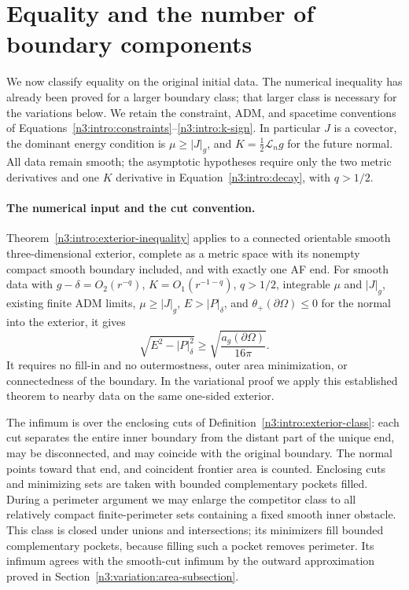 \section{Equality and the number of boundary components}
\label{n3:rigidity:setup}

We now classify equality on the original initial data. The numerical
inequality has already been proved for a larger boundary class; that
larger class is necessary for the variations below. We retain the
constraint, ADM, and spacetime conventions of
Equations~\eqref{n3:intro:constraints}--\eqref{n3:intro:k-sign}.
In particular $J$ is a covector, the dominant energy condition is
$\mu\geq|J|_g$, and $K=\tfrac12\mathcal L_n g$ for the future normal.
All data remain smooth; the asymptotic hypotheses require only the two
metric derivatives and one $K$ derivative in
Equation~\eqref{n3:intro:decay}, with $q>1/2$.

\paragraph{The numerical input and the cut convention.}
Theorem~\ref{n3:intro:exterior-inequality} applies to a connected orientable
smooth three-dimensional exterior, complete as a metric space with its
nonempty compact smooth boundary included, and with exactly one AF end.
For smooth data with $g-\delta=O_2(r^{-q})$,
$K=O_1(r^{-1-q})$, $q>1/2$, integrable $\mu$ and $|J|_g$, existing
finite ADM limits, $\mu\geq|J|_g$, $E>|P|_\delta$, and
$\theta_+(\partial\Omega)\leq0$ for the normal into the exterior, it gives
\[
\sqrt{E^2-|P|_\delta^2}\geq
\sqrt{\frac{a_g(\partial\Omega)}{16\pi}}.
\]
It requires no fill-in and no outermostness, outer area minimization,
or connectedness of the boundary. In the variational proof we apply
this established theorem to nearby data on the same one-sided exterior.

The infimum is over the enclosing cuts of
Definition~\ref{n3:intro:exterior-class}: each cut separates the entire
inner boundary from the distant part of the unique end, may be
disconnected, and may coincide with the original boundary. The normal
points toward that end, and coincident frontier area is counted.
Enclosing cuts and minimizing sets are taken with bounded complementary
pockets filled. During a perimeter argument we may enlarge the
competitor class to all relatively compact finite-perimeter sets
containing a fixed smooth inner obstacle. This class is closed under
unions and intersections; its minimizers fill bounded complementary
pockets, because filling such a pocket removes perimeter. Its infimum
agrees with the smooth-cut infimum by the outward approximation proved
in Section~\ref{n3:variation:area-subsection}.


